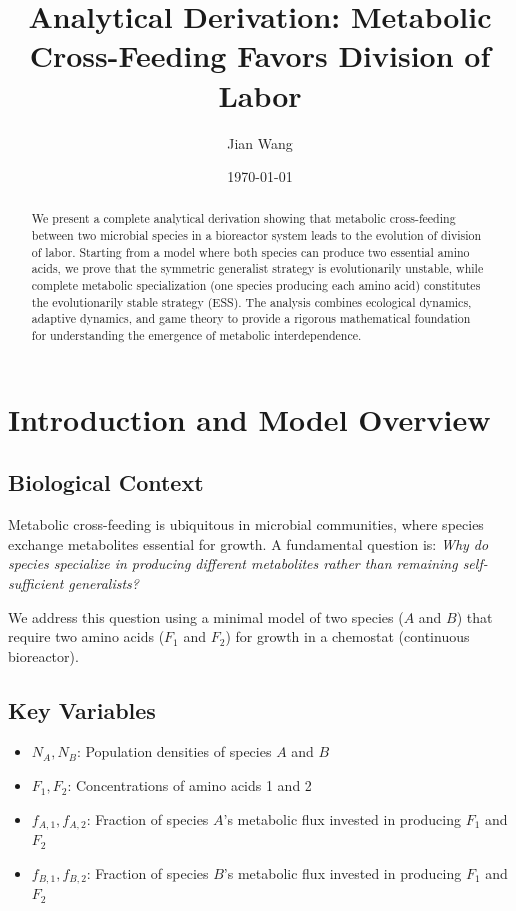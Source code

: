 \documentclass[11pt]{article}
\title{Analytical Derivation: Metabolic Cross-Feeding Favors Division of Labor}
\author{Jian Wang}
\date{\today}
\theoremstyle{definition}
\theoremstyle{remark}
\begin{document}
\maketitle

\begin{abstract}
We present a complete analytical derivation showing that metabolic cross-feeding between two microbial species in a bioreactor system leads to the evolution of division of labor. Starting from a model where both species can produce two essential amino acids, we prove that the symmetric generalist strategy is evolutionarily unstable, while complete metabolic specialization (one species producing each amino acid) constitutes the evolutionarily stable strategy (ESS). The analysis combines ecological dynamics, adaptive dynamics, and game theory to provide a rigorous mathematical foundation for understanding the emergence of metabolic interdependence.
\end{abstract}

\tableofcontents
\newpage

\section{Introduction and Model Overview}

\subsection{Biological Context}

Metabolic cross-feeding is ubiquitous in microbial communities, where species exchange metabolites essential for growth. A fundamental question is: \textit{Why do species specialize in producing different metabolites rather than remaining self-sufficient generalists?}

We address this question using a minimal model of two species ($A$ and $B$) that require two amino acids ($F_1$ and $F_2$) for growth in a chemostat (continuous bioreactor).

\subsection{Key Variables}

\begin{itemize}
    \item $N_A, N_B$: Population densities of species $A$ and $B$
    \item $F_1, F_2$: Concentrations of amino acids 1 and 2
    \item $f_{A,1}, f_{A,2}$: Fraction of species $A$'s metabolic flux invested in producing $F_1$ and $F_2$
    \item $f_{B,1}, f_{B,2}$: Fraction of species $B$'s metabolic flux invested in producing $F_1$ and $F_2$
\end{itemize}
\end{document}
